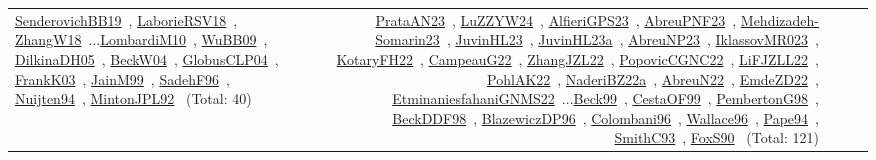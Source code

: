 {\begin{longtable}{p{3cm}r>{\raggedright\arraybackslash}p{6cm}>{\raggedright\arraybackslash}p{6cm}>{\raggedright\arraybackslash}p{8cm}}
\href{../works/SenderovichBB19.pdf}{SenderovichBB19}~\cite{SenderovichBB19}, \href{../works/LaborieRSV18.pdf}{LaborieRSV18}~\cite{LaborieRSV18}, \href{../works/ZhangW18.pdf}{ZhangW18}~\cite{ZhangW18}...\href{../works/LombardiM10.pdf}{LombardiM10}~\cite{LombardiM10}, \href{../works/WuBB09.pdf}{WuBB09}~\cite{WuBB09}, \href{../works/DilkinaDH05.pdf}{DilkinaDH05}~\cite{DilkinaDH05}, \href{../works/BeckW04.pdf}{BeckW04}~\cite{BeckW04}, \href{../works/GlobusCLP04.pdf}{GlobusCLP04}~\cite{GlobusCLP04}, \href{../works/FrankK03.pdf}{FrankK03}~\cite{FrankK03}, \href{../works/JainM99.pdf}{JainM99}~\cite{JainM99}, \href{../works/SadehF96.pdf}{SadehF96}~\cite{SadehF96}, \href{../works/Nuijten94.pdf}{Nuijten94}~\cite{Nuijten94}, \href{../works/MintonJPL92.pdf}{MintonJPL92}~\cite{MintonJPL92} (Total: 40) & \href{../works/PrataAN23.pdf}{PrataAN23}~\cite{PrataAN23}, \href{../works/LuZZYW24.pdf}{LuZZYW24}~\cite{LuZZYW24}, \href{../works/AlfieriGPS23.pdf}{AlfieriGPS23}~\cite{AlfieriGPS23}, \href{../works/AbreuPNF23.pdf}{AbreuPNF23}~\cite{AbreuPNF23}, \href{../works/Mehdizadeh-Somarin23.pdf}{Mehdizadeh-Somarin23}~\cite{Mehdizadeh-Somarin23}, \href{../works/JuvinHL23.pdf}{JuvinHL23}~\cite{JuvinHL23}, \href{../works/JuvinHL23a.pdf}{JuvinHL23a}~\cite{JuvinHL23a}, \href{../works/AbreuNP23.pdf}{AbreuNP23}~\cite{AbreuNP23}, \href{../works/IklassovMR023.pdf}{IklassovMR023}~\cite{IklassovMR023}, \href{../works/KotaryFH22.pdf}{KotaryFH22}~\cite{KotaryFH22}, \href{../works/CampeauG22.pdf}{CampeauG22}~\cite{CampeauG22}, \href{../works/ZhangJZL22.pdf}{ZhangJZL22}~\cite{ZhangJZL22}, \href{../works/PopovicCGNC22.pdf}{PopovicCGNC22}~\cite{PopovicCGNC22}, \href{../works/LiFJZLL22.pdf}{LiFJZLL22}~\cite{LiFJZLL22}, \href{../works/PohlAK22.pdf}{PohlAK22}~\cite{PohlAK22}, \href{../works/NaderiBZ22a.pdf}{NaderiBZ22a}~\cite{NaderiBZ22a}, \href{../works/AbreuN22.pdf}{AbreuN22}~\cite{AbreuN22}, \href{../works/EmdeZD22.pdf}{EmdeZD22}~\cite{EmdeZD22}, \href{../works/EtminaniesfahaniGNMS22.pdf}{EtminaniesfahaniGNMS22}~\cite{EtminaniesfahaniGNMS22}...\href{../works/Beck99.pdf}{Beck99}~\cite{Beck99}, \href{../works/CestaOF99.pdf}{CestaOF99}~\cite{CestaOF99}, \href{../works/PembertonG98.pdf}{PembertonG98}~\cite{PembertonG98}, \href{../works/BeckDDF98.pdf}{BeckDDF98}~\cite{BeckDDF98}, \href{../works/BlazewiczDP96.pdf}{BlazewiczDP96}~\cite{BlazewiczDP96}, \href{../works/Colombani96.pdf}{Colombani96}~\cite{Colombani96}, \href{../works/Wallace96.pdf}{Wallace96}~\cite{Wallace96}, \href{../works/Pape94.pdf}{Pape94}~\cite{Pape94}, \href{../works/SmithC93.pdf}{SmithC93}~\cite{SmithC93}, \href{../works/FoxS90.pdf}{FoxS90}~\cite{FoxS90} (Total: 121)\\

\end{longtable}}
